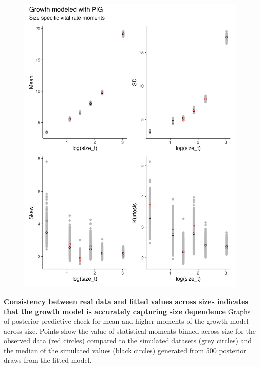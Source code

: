 \documentclass[12pt]{article}
\begin{document}
\begin{figure}
	\centering
	\includegraphics[width=.6\linewidth]{size_ppc_plot.png}
\end{figure}
 \textbf{Consistency between real data and fitted values across sizes indicates that the growth model is accurately capturing size dependence} Graphs of posterior predictive check for mean and higher moments of the growth model across size. Points show the value of statistical moments binned across size for the observed data (red circles) compared to the simulated datasets (grey circles) and the median of the simulated values (black circles) generated from 500 posterior draws from the fitted model. 
\newpage
\end{document}
